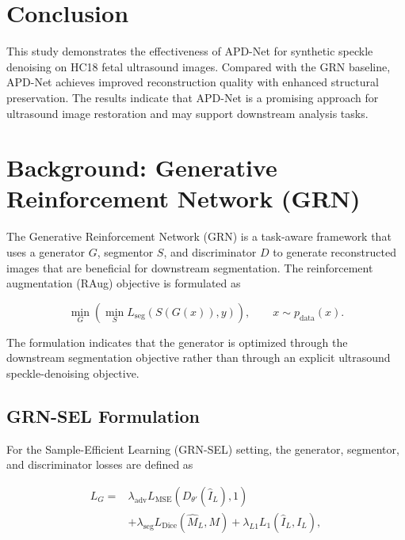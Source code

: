 \documentclass[conference]{IEEEtran}
\begin{document}
\section{Conclusion}

This study demonstrates the effectiveness of APD-Net for synthetic speckle denoising on HC18 fetal ultrasound images. Compared with the GRN baseline, APD-Net achieves improved reconstruction quality with enhanced structural preservation. The results indicate that APD-Net is a promising approach for ultrasound image restoration and may support downstream analysis tasks.



\section{Background: Generative Reinforcement Network (GRN)}

The Generative Reinforcement Network (GRN) is a task-aware framework
that uses a generator $G$, segmentor $S$, and discriminator $D$ to
generate reconstructed images that are beneficial for downstream
segmentation. The reinforcement augmentation (RAug) objective is
formulated as

\begin{equation}
\min_G
\left(
\min_S
L_{\mathrm{seg}}
\left(
S(G(x)),y
\right)
\right),
\qquad
x\sim p_{\mathrm{data}}(x).
\end{equation}

The formulation indicates that the generator is optimized through
the downstream segmentation objective rather than through an explicit
ultrasound speckle-denoising objective.


\subsection{GRN-SEL Formulation}

For the Sample-Efficient Learning (GRN-SEL) setting, the generator,
segmentor, and discriminator losses are defined as

\begin{align}
L_G
={}&
\lambda_{\mathrm{adv}}
L_{\mathrm{MSE}}
\left(
D_{\theta'}(\hat I_L),1
\right)
\nonumber\\
&+
\lambda_{\mathrm{seg}}
L_{\mathrm{Dice}}
\left(
\hat M_L,M
\right)
+
\lambda_{L1}
L_1
\left(
\hat I_L,I_L
\right),
\end{align}
\end{document}
